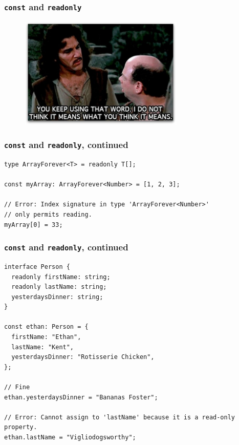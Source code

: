 \documentclass[aspectratio=169]{beamer}
\begin{document}
\begin{frame}[fragile]
  \frametitle{\texttt{const} and \texttt{readonly}}
  \begin{figure}
    \href{https://bit.ly/32dLNpz}{\includegraphics[width=0.7\textwidth]{using_that_word.jpg}}
  \end{figure}
\end{frame}

\begin{frame}[fragile]
  \frametitle{\texttt{const} and \texttt{readonly}, continued}

  \begin{verbatim}
type ArrayForever<T> = readonly T[];

const myArray: ArrayForever<Number> = [1, 2, 3];

// Error: Index signature in type 'ArrayForever<Number>'
// only permits reading.
myArray[0] = 33;

  \end{verbatim}
\end{frame}

\begin{frame}[fragile]
  \frametitle{\texttt{const} and \texttt{readonly}, continued}
  \small

  \begin{verbatim}
interface Person {
  readonly firstName: string;
  readonly lastName: string;
  yesterdaysDinner: string;
}

const ethan: Person = {
  firstName: "Ethan",
  lastName: "Kent",
  yesterdaysDinner: "Rotisserie Chicken",
};

// Fine
ethan.yesterdaysDinner = "Bananas Foster";

// Error: Cannot assign to 'lastName' because it is a read-only property.
ethan.lastName = "Vigliodogsworthy";

  \end{verbatim}
\end{frame}
\end{document}
